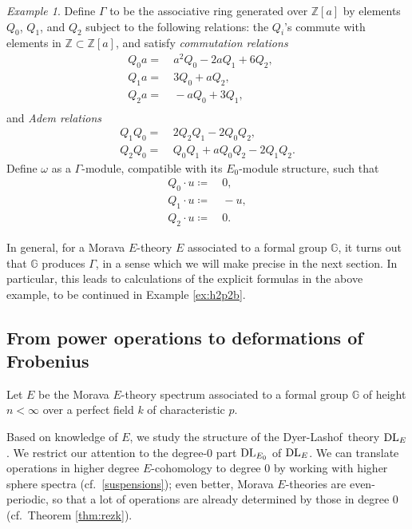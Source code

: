 \documentclass{gtpart}
\theoremstyle{definition}
\theoremstyle{remark}
\newtheorem{ex}[thm]{Example}
\newcommand{\mb}[1]{\mathbb{#1}}
\newcommand{\dl}{{\rm DL}}
\newcommand{\DL}{Dyer-Lashof~}
\newcommand{\BG}{{\mb G}}
\newcommand{\BZ}{{\mb Z}}
\newcommand{\G}{\Gamma}
\newcommand{\ce}{\coloneqq}
\numberwithin{equation}{section}
\numberwithin{thm}{section}
\begin{document}
\begin{ex}
\label{ex:h2p2a}
 Define $\G$ to be the associative ring generated over $\BZ [a]$ by 
 elements $Q_0$, $Q_1$, and $Q_2$ subject to the following relations: 
 the $Q_i$'s commute with elements in $\BZ \subset \BZ [a]$, and satisfy 
 {\em commutation relations} 
 \begin{equation*}
 \begin{split}
  Q_0 a = & ~ a^2 Q_0 - 2 a Q_1 + 6 Q_2, \quad ~ \\
  Q_1 a = & ~ 3 Q_0 + a Q_2, \\
  Q_2 a = & ~ -a Q_0 + 3 Q_1, \\
 \end{split}
 \end{equation*}
 and {\em Adem relations} 
 \begin{equation*}
 \begin{split}
  Q_1Q_0 = & ~ 2 Q_2Q_1 - 2 Q_0Q_2, \\
  Q_2Q_0 = & ~ Q_0Q_1 + a Q_0Q_2 - 2 Q_1Q_2.  
 \end{split}
 \end{equation*}
 Define $\omega$ as a $\G$-module, compatible with its $E_0$-module 
 structure, such that 
 \begin{equation*}
 \begin{split}
  Q_0 \cdot u \ce & ~ 0, \\
  Q_1 \cdot u \ce & ~ -u, \\
  Q_2 \cdot u \ce & ~ 0.  
 \end{split}
 \end{equation*}
\end{ex}

In general, for a Morava $E$-theory $E$ associated to a formal group 
$\BG$, it turns out that $\BG$ produces $\G$, in a sense which we will 
make precise in the next section.  In particular, this leads to 
calculations of the explicit formulas in the above example, to be 
continued in Example \ref{ex:h2p2b}.  


\subsection{From power operations to deformations of Frobenius}
\label{subsec:bridge}

Let $E$ be the Morava $E$-theory spectrum associated to a formal group 
$\BG$ of height $n<\infty$ over a perfect field $k$ of characteristic 
$p$.  

Based on knowledge of $E$, we study the structure of the \DL theory 
$\dl_E$.  We restrict our attention to the degree-0 part $\dl_{E_0}$ of 
$\dl_E$.  We can translate operations in higher degree $E$-cohomology to 
degree 0 by working with higher sphere spectra (cf.~\eqref{suspensions}); 
even better, Morava $E$-theories are even-periodic, so that a lot of 
operations are already determined by those in degree 0 (cf.~Theorem 
\ref{thm:rezk}).  
\end{document}
